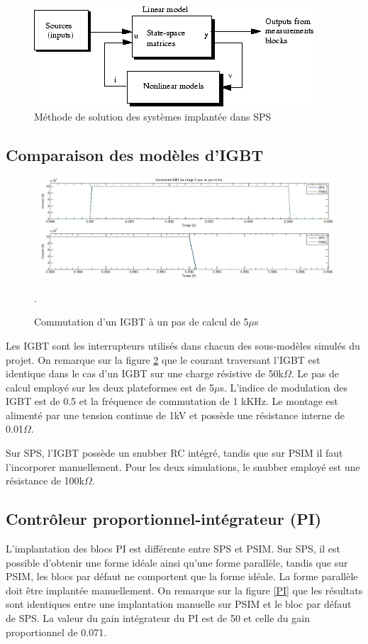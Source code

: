 \begin{figure}
\centering
\includegraphics[scale=0.7]{Fig/Comp/improving_performance5.png}
\caption{Méthode de solution des systèmes implantée dans SPS}
\label{fig_solving_SPS}
\end{figure}

\subsection{Comparaison des modèles d'IGBT}

\begin{figure}[htb]
\centering
\includegraphics[scale=0.5]{fig/Comp/IGBT.jpg}
\caption{Commutation d'un IGBT à un pas de calcul de 5$\mu$s}.
\label{IG}
\end{figure}

Les IGBT sont les interrupteurs utilisés dans chacun des sous-modèles simulés du projet. On remarque sur la figure \ref{IG} que le  courant traversant l'IGBT est identique dans le cas d'un IGBT sur une charge résistive de 50k$\Omega$. Le pas de calcul employé sur les deux plateformes est de 5$\mu$s. L'indice de modulation des IGBT est de 0.5 et la fréquence de commutation de 1 kKHz. Le montage est alimenté par une tension continue de 1kV et possède une résistance interne de 0.01$\Omega$. 

Sur SPS, l'IGBT possède un snubber RC intégré, tandis que sur PSIM il faut l'incorporer manuellement. Pour les deux simulations, le snubber employé est une résistance de 100k$\Omega$.
 
\subsection{Contrôleur proportionnel-intégrateur (PI)}
L'implantation des blocs PI est différente entre SPS et PSIM. Sur SPS, il est possible d'obtenir une forme idéale ainsi qu'une forme parallèle, tandis que sur PSIM, les blocs par défaut ne comportent que la forme idéale. La forme parallèle doit être implantée manuellement. On remarque sur la figure \ref{PI} que les résultats sont identiques entre une implantation manuelle sur PSIM et le bloc par défaut de SPS. La valeur du gain intégrateur du PI est de 50 et celle du gain proportionnel de 0.071. 

